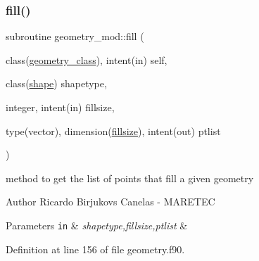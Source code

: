 \subsubsection{\texorpdfstring{fill()}{fill()}}
{\footnotesize\ttfamily subroutine geometry\+\_\+mod\+::fill (\begin{DoxyParamCaption}\item[{class(\mbox{\hyperlink{structgeometry__mod_1_1geometry__class}{geometry\+\_\+class}}), intent(in)}]{self,  }\item[{class(\mbox{\hyperlink{structgeometry__mod_1_1shape}{shape}})}]{shapetype,  }\item[{integer, intent(in)}]{fillsize,  }\item[{type(vector), dimension(\mbox{\hyperlink{namespacegeometry__mod_a92602e1198d3607613ea2722fb002685}{fillsize}}), intent(out)}]{ptlist }\end{DoxyParamCaption})\hspace{0.3cm}{\ttfamily [private]}}



method to get the list of points that fill a given geometry 

\begin{DoxyAuthor}{Author}
Ricardo Birjukovs Canelas -\/ M\+A\+R\+E\+T\+EC
\end{DoxyAuthor}

\begin{DoxyParams}[1]{Parameters}
\mbox{\tt in}  & {\em shapetype,fillsize,ptlist} & \\
\hline
\end{DoxyParams}


Definition at line 156 of file geometry.\+f90.


